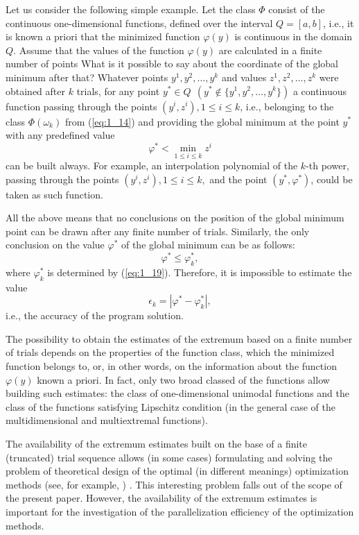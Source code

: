 Let us consider the following simple example. Let the class $\Phi$ consist of the continuous one-dimensional functions, defined over the interval $Q=[a,b]$, i.e., it is known a priori that the minimized function $\varphi(y)$ is continuous in the domain $Q$. Assume that the values of the function $\varphi(y)$ are calculated in a finite number of points   What is it possible to say about the coordinate of the global minimum after that? Whatever points $y^1,y^2,\ldots,y^k$  and values $z^1,z^2,\ldots,z^k$ were obtained after $k$  trials, for any point $y^*\in Q \ \ (y^*\notin \{y^1,y^2,\ldots,y^k\})$   a continuous function passing through the points $(y^i,z^i),1\leq i\leq k$,  i.e., belonging to the class $\Phi(\omega_k)$ from (\ref{eq:1_14}) and providing the global minimum at the point $y^*$  with any predefined value
\begin{displaymath}
\varphi^*<\min_{1\leq i\leq k} z^i 
\end{displaymath}
can be built always. For example, an interpolation polynomial of the $k$-th power, passing through the points  $(y^i,z^i),1\leq i\leq k,$ and the point $(y^*,\varphi^*)$, could be taken as such function.

All the above means that no conclusions on the position of the global minimum point can be drawn after any  finite number of trials. Similarly, the only conclusion on the value $\varphi^*$  of the global minimum can be as follows:
\begin{displaymath}
\varphi^*\leq \varphi_k^*, 
\end{displaymath}
where $\varphi_k^*$  is determined by (\ref{eq:1_19}). Therefore, it is impossible to estimate the value 
\begin{displaymath}
\epsilon_k=\left|\varphi^*-\varphi_k^*\right|, 
\end{displaymath}
i.e., the accuracy of the program solution.

The possibility to obtain the estimates of the extremum based on a finite number of trials depends on the properties of the function class, which the minimized function belongs to, or, in other words, on the information about the function $\varphi(y)$ known a priori. In fact, only two broad classed of the functions allow building such estimates: the class of one-dimensional unimodal functions and the class of the functions satisfying Lipschitz condition (in the general case of the multidimensional and multiextremal functions).

The availability of the extremum estimates built on the base of a finite (truncated) trial sequence allows (in some cases) formulating and solving the problem of theoretical design of the optimal (in different meanings) optimization methods (see, for example, \cite{1_Kushner, 1_Mockus, 1_StrSergMon2000, 1_Sukharev1971, 1_Sukharev1972, 1_Sukharev1989}) . This interesting problem falls out of the scope of the present paper. However, the availability of the extremum estimates is important for the investigation of the parallelization efficiency of the optimization methods.

